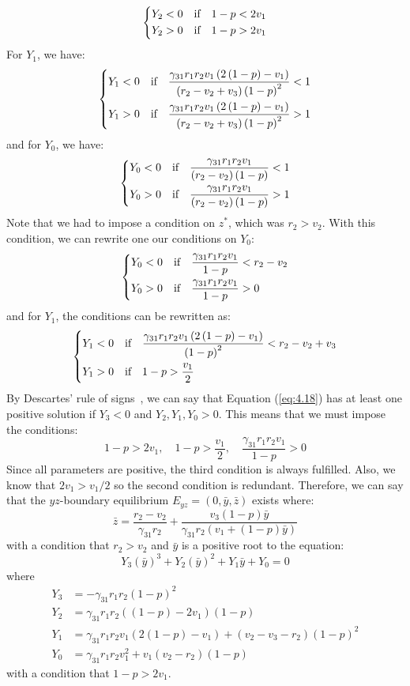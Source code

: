 \[
\begin{dcases}
    Y_2<0 &\text{if}\quad 1-p<2v_1\\
    Y_2>0 &\text{if}\quad 1-p>2v_1
\end{dcases}
\]
For $Y_1$, we have:
\[
\begin{dcases}
    Y_1<0 &\text{if}\quad \frac{\gamma_{31}r_1r_2v_1\left(2\left(1-p\right)-v_1\right)}{\left(r_2-v_2+v_3\right)\left(1-p\right)^2}<1\\
    Y_1>0 &\text{if}\quad \frac{\gamma_{31}r_1r_2v_1\left(2\left(1-p\right)-v_1\right)}{\left(r_2-v_2+v_3\right)\left(1-p\right)^2}>1
\end{dcases}
\]
and for $Y_0$, we have:
\[
\begin{dcases}
    Y_0<0 &\text{if}\quad \frac{\gamma_{31}r_1r_2v_1}{\left(r_2-v_2\right)\left(1-p\right)}<1\\
    Y_0>0 &\text{if}\quad \frac{\gamma_{31}r_1r_2v_1}{\left(r_2-v_2\right)\left(1-p\right)}>1
\end{dcases}
\]
Note that we had to impose a condition on $z^*$, which was $r_2>v_2$. With this condition, we can rewrite one our conditions on $Y_0$:
\[
\begin{dcases}
    Y_0<0 &\text{if}\quad \frac{\gamma_{31}r_1r_2v_1}{1-p}<r_2-v_2\\
    Y_0>0 &\text{if}\quad \frac{\gamma_{31}r_1r_2v_1}{1-p}>0
\end{dcases}
\]
and for $Y_1$, the conditions can be rewritten as:
\[
\begin{dcases}
    Y_1<0 &\text{if}\quad \frac{\gamma_{31}r_1r_2v_1\left(2\left(1-p\right)-v_1\right)}{\left(1-p\right)^2}<r_2-v_2+v_3\\
    Y_1>0 &\text{if}\quad 1-p>\frac{v_1}2
\end{dcases}
\]
By Descartes' rule of signs~\cite{10.2307/1967494}, we can say that Equation (\ref{eq:4.18}) has at least one positive solution if $Y_3<0$ and $Y_2,Y_1,Y_0>0$. This means that we must impose the conditions:
\[
1-p>2v_1,\quad 1-p>\frac{v_1}2,\quad \frac{\gamma_{31}r_1r_2v_1}{1-p}>0
\]
Since all parameters are positive, the third condition is always fulfilled. Also, we know that $2v_1>v_1/2$ so the second condition is redundant. Therefore, we can say that the $yz$-boundary equilibrium $E_{yz}=\left(0,\bar{y},\bar{z}\right)$ exists where:
\[
\bar{z}=\frac{r_2-v_2}{\gamma_{31}r_2}+\frac{v_3\left(1-p\right)\bar{y}}{\gamma_{31}r_2\left(v_1+\left(1-p\right)\bar{y}\right)}
\]
with a condition that $r_2>v_2$ and $\bar{y}$ is a positive root to the equation:
\begin{equation*}
    Y_3\left(\bar{y}\right)^3+Y_2\left(\bar{y}\right)^2+Y_1\bar{y}+Y_0=0
\end{equation*}
where
\begin{align*}
    Y_3 &= -\gamma_{31}r_1r_2\left(1-p\right)^2\\
    Y_2 &= \gamma_{31}r_1r_2\left(\left(1-p\right)-2v_1\right)\left(1-p\right)\\
    Y_1 &= \gamma_{31}r_1r_2v_1\left(2\left(1-p\right)-v_1\right)+\left(v_2-v_3-r_2\right)\left(1-p\right)^2\\
    Y_0 &= \gamma_{31}r_1r_2v_1^2+v_1\left(v_2-r_2\right)\left(1-p\right)
\end{align*}
with a condition that $1-p>2v_1$.

